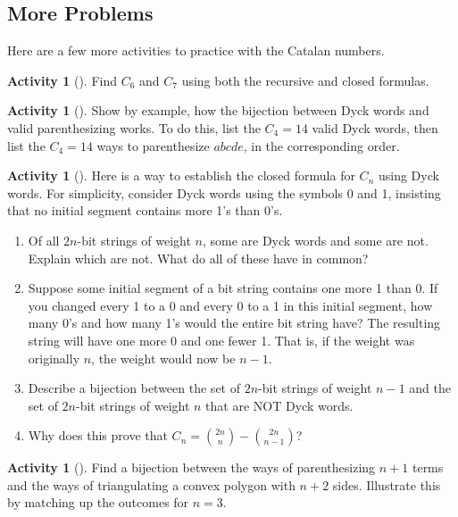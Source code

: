 \documentclass[10pt,]{book}
\theoremstyle{plain}
\theoremstyle{definition}
\theoremstyle{definition}
\theoremstyle{definition}
\newtheorem{activity}[project]{Activity}
\numberwithin{equation}{chapter}
\begin{document}
\subsection[{More Problems}]{More Problems}\label{subsec-catalanproblems}
\hypertarget{p-615}{}%
Here are a few more activities to practice with the Catalan numbers.%
\begin{activity}[]\label{activity-122}
\hypertarget{p-616}{}%
Find \(C_6\) and \(C_7\) using both the recursive and closed formulas.%
\end{activity}
\begin{activity}[]\label{activity-123}
\hypertarget{p-617}{}%
Show by example, how the bijection between Dyck words and valid parenthesizing works.  To do this, list the \(C_4 = 14\) valid Dyck words, then list the \(C_4 = 14\) ways to parenthesize \(abcde\), in the corresponding order.%
\end{activity}
\begin{activity}[]\label{activity-124}
\hypertarget{p-619}{}%
Here is a way to establish the closed formula for \(C_n\) using Dyck words.  For simplicity, consider Dyck words using the symbols 0 and 1, insisting that no initial segment contains more 1's than 0's.%
\begin{enumerate}[font=\bfseries,label=(\alph*),ref=\alph*]
\item\label{task-128} \hypertarget{p-620}{}%
Of all \(2n\)-bit strings of weight \(n\), some are Dyck words and some are not.  Explain which are not.  What do all of these have in common?%
\item\label{task-129} \hypertarget{p-622}{}%
Suppose some initial segment of a bit string contains one more 1 than 0.  If you changed every 1 to a 0 and every 0 to a 1 in this initial segment, how many 0's and how many 1's would the entire bit string have?%
\hypertarget{p-623}{}%
The resulting string will have one more 0 and one fewer 1.  That is, if the weight was originally \(n\), the weight would now be \(n-1\).%
\item\label{task-130} \hypertarget{p-624}{}%
Describe a bijection between the set of \(2n\)-bit strings of weight \(n-1\) and the set of \(2n\)-bit strings of weight \(n\) that are NOT Dyck words.%
\item\label{task-131} \hypertarget{p-626}{}%
Why does this prove that \(C_n = \binom{2n}{n} - \binom{2n}{n-1}\)?%
\end{enumerate}
\end{activity}
\begin{activity}[]\label{activity-125}
\hypertarget{p-628}{}%
Find a bijection between the ways of parenthesizing \(n+1\) terms and the ways of triangulating a convex polygon with \(n+2\) sides.  Illustrate this by matching up the outcomes for \(n = 3\).%
\end{activity}
\end{document}
